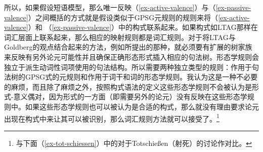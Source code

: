 \begin{exe}
\begin{xlist}[iv.]
\begin{exe}
\begin{xlist}[iv.]
所以，如果假设短语模型，那么唯一反映（\ref{ex-active-valence}）与（\ref{ex-passive-valence}）之间概括的方式就是假设类似于GPSG元规则的规则来将（\ref{ex-active-valence}）和 （\ref{ex-passive-valence}）中的构式联系起来。如果构式如LTAG那样在词汇层面上联系起来，那么相应的映射规则都是词汇规则。对于将LTAG与Goldberg的观点结合起来的方法，例如\citet{KO2012a}所提出的那种，就必须要有扩展的树家族来反映有另外论元可能性并且确保正确形态形式插入相应的句法树。形态学规则会独立于派生动词性词项使用的句法结构。所以需要两种独立类型的规则：作用于句法树的GPSG式的元规则和作用于词干和词的形态学规则。我认为这是一种不必要的麻烦，而且除了麻烦之外，按照构式语法的定义这些形态学规则不会被认为是形式-意义偶对，因为形式的一方面（即需要另外的论元）没有反映在这些形态学规则中。如果这些形态学规则也可以被认为是合适的构式，那么就没有理由要求论元出现在构式中来让其可以被识别，那么词汇规则方法就可以接受了。\footnote{%
与下面（\ref{ex-tot-schiessen}）中的对于Totschießen（射死）的讨论作对比。%
}


\end{xlist}
\end{exe}
\end{xlist}
\end{exe}
